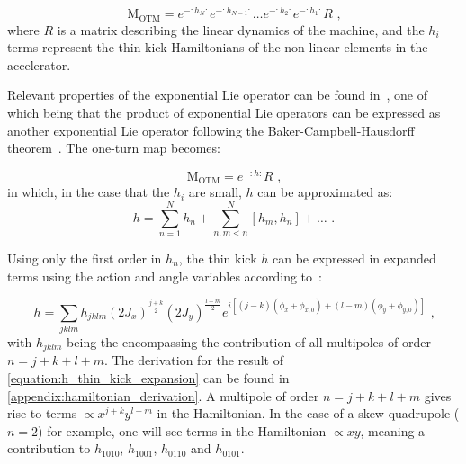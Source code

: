 \begin{equation}
    \mathrm{M_{OTM}} =e^{-:h_N:} e^{-:h_{N-1}:} \ldots e^{-:h_2:} e^{-:h_1:} R \text{ ,}
    \label{equation:one_turn_map_non_linear}
\end{equation}
where \(R\) is a matrix describing the linear dynamics of the machine, and the \(h_i\) terms represent the thin kick Hamiltonians of the non-linear elements in the accelerator.

Relevant properties of the exponential Lie operator can be found in~\cite{PHD:Tomas, PHD:Franchi}, one of which being that the product of exponential Lie operators can be expressed as another exponential Lie operator following the Baker-Campbell-Hausdorff theorem~\cite{BOOK:Hall:Lie_Group_Algebra_Representations}.
The one-turn map becomes:

\begin{equation}
    \mathrm{M_{OTM}} = e^{-:h:} R \text{ ,}
    \label{equation:Campbell_Baker_Hausdorff_theorem}
\end{equation}
in which, in the case that the \(h_i\) are small, \(h\) can be approximated as:
\begin{equation}
    h = \sum_{n=1}^N h_n + \sum_{n, m<n}^N \left[ h_m, h_n \right] + \ldots \text{ .}
    \label{equation:h_thin_kick_approximation}
\end{equation}

Using only the first order in \(h_n\), the thin kick \(h\) can be expressed in expanded terms using the action and angle variables according to~\cite{PHD:Franchi}:

\begin{equation}
    h = \sum_{jklm} h_{jklm} \left( 2 J_x \right)^{\frac{j+k}{2}} \left( 2 J_y \right)^{\frac{l+m}{2}} e^{i \left[ \left(j-k\right) \left(\phi_x + \phi_{x,0} \right) + \left(l-m\right) \left(\phi_y + \phi_{y,0} \right) \right]} \text{ ,}
    \label{equation:h_thin_kick_expansion}
\end{equation}
with \(h_{jklm}\) being the  encompassing the contribution of all multipoles of order \(n = j + k + l + m\). 
The derivation for the result of \cref{equation:h_thin_kick_expansion} can be found in \cref{appendix:hamiltonian_derivation}.
A multipole of order \(n = j + k + l + m\) gives rise to terms \(\propto x^{j+k} y^{l+m}\) in the Hamiltonian.
In the case of a \gls{skew} quadrupole (\(n=2\)) for example, one will see terms in the Hamiltonian \(\propto xy\), meaning a contribution to \(h_{1010}\), \(h_{1001}\), \(h_{0110}\) and \(h_{0101}\).

